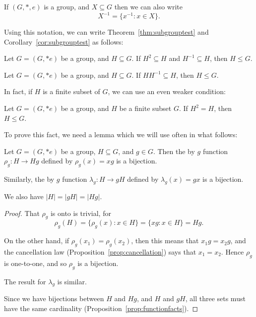 If $(G, \ast, e)$ is a group, and $X \subseteq G$ then we can also write
\[
  X^{-1} = \{x^{-1} : x \in X\}.
\]

Using this notation, we can write Theorem~\ref{thm:subgrouptest} and
Corollary~\ref{cor:subgrouptest} as follows:

\begin{corollary}
  Let $G = (G, \ast e)$ be a group, and $H \subseteq G$. If $H^{2} 
  \subseteq H$ and $H^{-1} \subseteq H$, then $H \le G$.
\end{corollary}

\begin{corollary}
  Let $G = (G, \ast e)$ be a group, and $H \subseteq G$. If $HH^{-1} 
  \subseteq H$, then $H \le G$.
\end{corollary}

In fact, if $H$ is a finite subset of $G$, we can use an even weaker 
condition:

\begin{proposition}\label{prop:subgrouptest3}
  Let $G = (G, \ast e)$ be a group, and $H$ be a finite subset $G$. If $H^{2} 
  = H$, then $H \le G$.
\end{proposition}

To prove this fact, we need a lemma which we will use often in what 
follows:

\begin{lemma}\label{lemma:translation}
  Let $G = (G, \ast e)$ be a group, $H \subseteq G$, and $g \in G$. 
  Then the  by $g$ function
  $\rho_{g} : H \to Hg$ defined by $\rho_{g}(x) = xg$ is a bijection.
  
  Similarly, the  by $g$
  function $\lambda_{g} : H \to gH$ defined by $\lambda_{g}(x) = gx$
  is a bijection.
  
  We also have $|H| = |gH| = |Hg|$.
\end{lemma}

\begin{proof}
  That $\rho_{g}$ is onto is trivial, for
  \[
    \rho_{g}(H) = \{ \rho_{g}(x) : x \in H \} = \{ xg : x \in H \} = 
    Hg.
  \]
  
  On the other hand, if $\rho_{g}(x_{1}) = \rho_{g}(x_{2})$, then 
  this means that $x_{1}g = x_{2}g$, and the cancellation law 
  (Proposition~\ref{prop:cancellation}) says that $x_{1} = x_{2}$.  
  Hence $\rho_{g}$ is one-to-one, and so $\rho_{g}$ is a bijection.
  
  The result for $\lambda_{g}$ is similar.
  
  Since we have bijections between $H$ and $Hg$, and $H$ and $gH$, all 
  three sets must have the same cardinality 
  (Proposition~\ref{prop:functionfacts}).
\end{proof}

